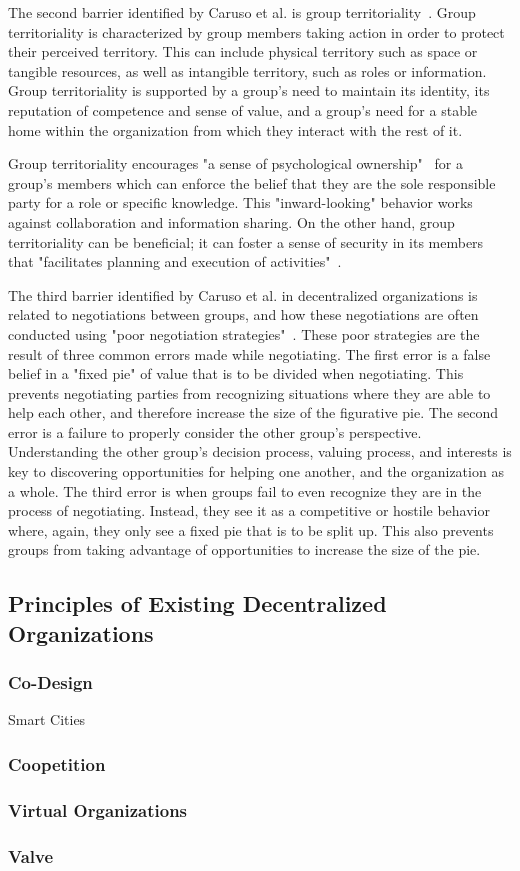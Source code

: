 The second barrier identified by Caruso et al. is group territoriality~\cite{caruso2008boundaries}. Group territoriality is characterized by group members taking action in order to protect their perceived territory. This can include physical territory such as space or tangible resources, as well as intangible territory, such as roles or information. Group territoriality is supported by a group's need to maintain its identity, its reputation of competence and sense of value, and a group's need for a stable home within the organization from which they interact with the rest of it.

Group territoriality encourages "a sense of psychological ownership"~\cite{caruso2008boundaries} for a group's members which can enforce the belief that they are the sole responsible party for a role or specific knowledge. This "inward-looking" behavior works against collaboration and information sharing. On the other hand, group territoriality can be beneficial; it can foster a sense of security in its members that "facilitates planning and execution of activities"~\cite{caruso2008boundaries}. 

The third barrier identified by Caruso et al. in decentralized organizations is related to negotiations between groups, and how these negotiations are often conducted using "poor negotiation  strategies"~\cite{caruso2008boundaries}. These poor strategies are the result of three common errors made while negotiating. The first error is a false belief in a "fixed pie" of value that is to be divided when negotiating. This prevents negotiating parties from recognizing situations where they are able to help each other, and therefore increase the size of the figurative pie. The second error is a failure to properly consider the other group's perspective. Understanding the other group's decision process, valuing process, and interests is key to discovering opportunities for helping one another, and the organization as a whole. The third error is when groups fail to even recognize they are in the process of negotiating. Instead, they see it as a competitive or hostile behavior where, again, they only see a fixed pie that is to be split up. This also prevents groups from taking advantage of opportunities to increase the size of the pie.    


\subsection{Principles of Existing Decentralized Organizations}

\subsubsection{Co-Design}
Smart Cities

\subsubsection{Coopetition}

\subsubsection{Virtual Organizations}

\subsubsection{Valve}